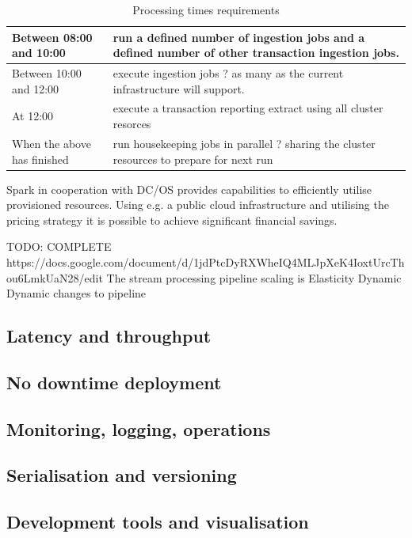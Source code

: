 \documentclass[a4paper, 10 pt, conference]{IEEEtran}
\begin{document}
\begin{table}[h]
\caption{Processing times requirements}
\label{tbl:processing-times-requirements}
\begin{center}
  \begin{tabular}{ | l | p{3cm} | }
    \hline
    Between 08:00 and 10:00 & run a defined number of ingestion jobs and a defined number of other transaction ingestion jobs.  \\ \hline
    Between 10:00 and 12:00 & execute ingestion jobs ? as many as the current infrastructure will support. \\ \hline
    At 12:00 & execute a transaction reporting extract using all cluster resorces \\ \hline
    When the above has finished & run housekeeping jobs in parallel ? sharing the cluster resources to prepare for next run \\
    \hline
  \end{tabular}
\end{center}
\end{table}

Spark in cooperation with DC/OS provides capabilities to efficiently utilise provisioned resources. Using e.g. a public cloud infrastructure and utilising the pricing strategy it is possible to achieve significant financial savings.
 
 
TODO: COMPLETE https://docs.google.com/document/d/1jdPtcDyRXWheIQ4MLJpXeK4IoxtUrcThou6LmkUaN28/edit
The stream processing pipeline scaling is 
Elasticity
Dynamic
Dynamic changes to pipeline

\subsection{Latency and throughput}
\subsection{No downtime deployment}
\subsection{Monitoring, logging, operations}
\subsection{Serialisation and versioning}
\subsection{Development tools and visualisation}
\end{document}
